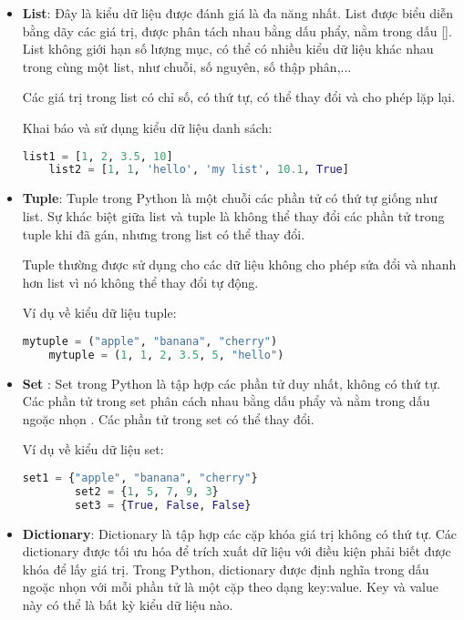 \documentclass[../main-report.tex]{subfiles}
\begin{document}
\begin{itemize}
\item \textbf{List}: Đây là kiểu dữ liệu được đánh giá là đa năng nhất. List được biểu diễn bằng dãy các giá trị, được phân tách nhau bằng dấu phẩy, nằm trong dấu []. List không giới hạn số lượng mục, có thể có nhiều kiểu dữ liệu khác nhau trong cùng một list, như chuỗi, số nguyên, số thập phân,...

Các giá trị trong list có chỉ số, có thứ tự, có thể thay đổi và cho phép lặp lại.
    \begin{example}
    Khai báo và sử dụng kiểu dữ liệu danh sách:
    \begin{lstlisting}[language=Python]
    list1 = [1, 2, 3.5, 10]
    list2 = [1, 1, 'hello', 'my list', 10.1, True]
    \end{lstlisting}
    \end{example}

\item \textbf{Tuple}: Tuple trong Python là một chuỗi các phần tử có thứ tự giống như list. Sự khác
biệt giữa list và tuple là không thể thay đổi các phần tử trong tuple khi đã gán,
nhưng trong list có thể thay đổi.

Tuple thường được sử dụng cho các dữ liệu không cho phép sửa đổi và
nhanh hơn list vì nó không thể thay đổi tự động.

    \begin{example}
    Ví dụ về kiểu dữ liệu tuple:
    \begin{lstlisting}[language=Python]
    mytuple = ("apple", "banana", "cherry")
    mytuple = (1, 1, 2, 3.5, 5, "hello")
    \end{lstlisting}
    \end{example}

\item \textbf{Set} : Set trong Python là tập hợp các phần tử duy nhất, không có thứ tự. Các phần tử
trong set phân cách nhau bằng dấu phẩy và nằm trong dấu ngoặc nhọn {}. Các
phần tử trong set có thể thay đổi.

    \begin{example}
    Ví dụ về kiểu dữ liệu set:
    \begin{lstlisting}[language=Python]
        set1 = {"apple", "banana", "cherry"}
        set2 = {1, 5, 7, 9, 3}
        set3 = {True, False, False}
    \end{lstlisting}
    \end{example}

\item \textbf{Dictionary}: Dictionary là tập hợp các cặp khóa giá trị không có thứ tự. Các dictionary được
tối ưu hóa để trích xuất dữ liệu với điều kiện phải biết được khóa để lấy giá trị.
Trong Python, dictionary được định nghĩa trong dấu ngoặc nhọn {} với mỗi
phần tử là một cặp theo dạng key:value. Key và value này có thể là bất kỳ kiểu
dữ liệu nào.


\end{itemize}
\end{document}
